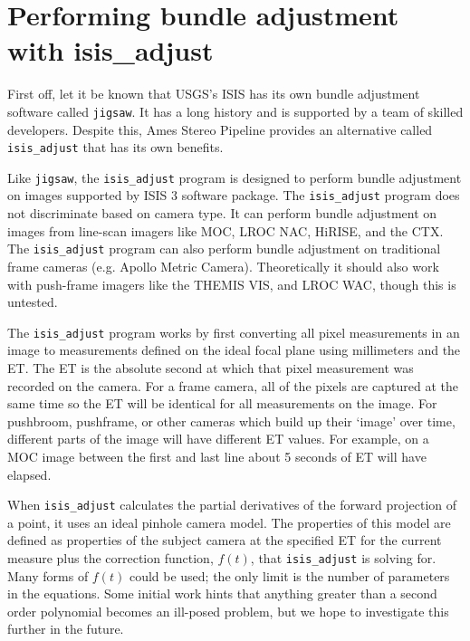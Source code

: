 \section{Performing bundle adjustment with isis\_adjust}

First off, let it be known that USGS's \ac{ISIS} has its own bundle
adjustment software called \texttt{jigsaw}. It has a long history and
is supported by a team of skilled developers. Despite this, Ames
Stereo Pipeline provides an alternative called \texttt{isis\_adjust}
that has its own benefits.

Like \texttt{jigsaw}, the \texttt{isis\_adjust} program is designed to
perform bundle adjustment on images supported by \ac{ISIS} 3
software package.  The \texttt{isis\_adjust} program does not
discriminate based on camera type.  It can perform bundle adjustment
on images from line-scan imagers like \ac{MOC}, \ac{LROC} NAC,
\ac{HiRISE}, and the \ac{CTX}. The \texttt{isis\_adjust} program can
also perform bundle adjustment on traditional frame cameras
(e.g. Apollo Metric Camera). Theoretically it should also work with
push-frame imagers like the \ac{THEMIS} VIS, and \ac{LROC} WAC, though
this is untested.

The \texttt{isis\_adjust} program works by first converting all
pixel measurements in an image to measurements defined on the ideal
focal plane using millimeters and the \ac{ET}. The \ac{ET} is the
absolute second at which that pixel measurement was recorded on the
camera.  For a frame camera, all of the pixels are captured at the
same time so the \ac{ET} will be identical for all measurements on
the image.  For pushbroom, pushframe, or other cameras which build
up their `image' over time, different parts of the image will have
different ET values.  For example, on a MOC image between the first
and last line about 5 seconds of \ac{ET} will have elapsed.

When \texttt{isis\_adjust} calculates the partial derivatives of the
forward projection of a point, it uses an ideal pinhole camera model.
The properties of this model are defined as properties of the subject
camera at the specified \ac{ET} for the current measure plus the
correction function, $f(t)$, that \texttt{isis\_adjust} is solving
for.  Many forms of $f(t)$ could be used; the only limit is the
number of parameters in the equations. Some initial work hints that
anything greater than a second order polynomial becomes an ill-posed
problem, but we hope to investigate this further in the future.

